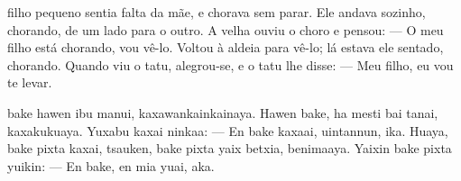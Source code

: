 

 filho pequeno sentia falta
da mãe, e chorava sem parar.
Ele andava sozinho, chorando,
de um lado para o outro.
A velha ouviu o choro e pensou:
--- O meu filho está chorando, vou vê-lo.
Voltou à aldeia para vê-lo; lá estava ele
sentado, chorando. Quando viu o tatu,
alegrou-se, e o tatu lhe disse:
--- Meu filho, eu vou te levar.

\vspace{2em}

 bake hawen ibu
manui, kaxawankainkainaya.
Hawen bake, ha mesti bai
tanai, kaxakukuaya.
Yuxabu kaxai ninkaa:
--- En bake kaxaai, uintannun, ika.
Huaya, bake pixta kaxai, tsauken,
bake pixta yaix betxia, benimaaya.
Yaixin bake pixta yuikin:
--- En bake, en mia yuai, aka.

\vspace*{\fill}

